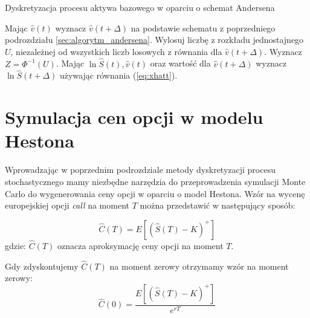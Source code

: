 \documentclass{pracamgr}
\begin{document}
\begin{algorithm}[H]
\caption{Dyskretyzacja procesu aktywa bazowego w oparciu o schemat Andersena}\label{andersenAlgorithmAssetLabel}

\begin{algorithmic}[1]

  \State Mając $\hat{v}(t)$ wyznacz $\hat{v}(t + \Delta)$ na podstawie 
         schematu z poprzedniego podrozdziału \ref{sec:algorytm_andersena}.
  \State Wylosuj liczbę z rozkładu jednostajnego $U$, niezależnej 
         od wszystkich liczb losowych z równania dla $\hat{v}(t + \Delta)$.
  \State Wyznacz $Z = \Phi^{-1}(U)$.
  \State Mając $\ln \hat{S}(t), \hat{v}(t)$ oraz wartość dla $\hat{v}(t + \Delta)$ 
         wyznacz $\ln \hat{S} (t+\Delta)$ używając równania (\ref{eq:xhatt}).

\end{algorithmic}
\label{alg:andersenAlgorithmAsset}
\end{algorithm}


\section{Symulacja cen opcji w modelu Hestona}

Wprowadzając w poprzednim podrozdziale metody dyskretyzacji procesu stochastycznego mamy niezbędne 
narzędzia do przeprowadzenia symulacji Monte Carlo do wygenerowania ceny opcji w oparciu o model 
Hestona.
Wzór na wycenę europejskiej opcji \textit{call} na moment $T$ można przedstawić w następujący sposób:

\begin{equation}
  \hat{C}(T) = E \left[ (\hat{S}(T) - K)^{+}  \right]
\end{equation}
gdzie: $\hat{C}(T)$ oznacza aproksymację ceny opcji na moment $T$.


Gdy zdyskontujemy $\hat{C}(T)$ na moment zerowy otrzymamy wzór na moment zerowy:
\begin{equation}
  \hat{C}(0) = \frac{E \left[ (\hat{S}(T) - K)^{+} \right]}{e^{rT}} 
\end{equation}


\end{document}
